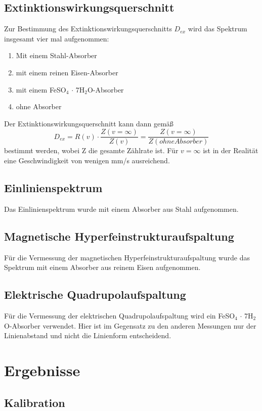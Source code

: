 \documentclass[12pt,a4paper]{article}
\begin{document}
\subsection{Extinktionswirkungsquerschnitt}
Zur Bestimmung des Extinktionswirkungsquerschnitts $D_{ex}$ wird das Spektrum insgesamt vier mal aufgenommen:
\begin{enumerate}
\item Mit einem Stahl-Absorber
\item mit einem reinen Eisen-Absorber
\item mit einem FeSO$_4$ $\cdot$ 7H$_2$O-Absorber
\item ohne Absorber 
\end{enumerate} 
Der Extinktionswirkungsquerschnitt kann dann gemäß
\begin{equation}
D_{ex} = R(v) \cdot \dfrac{Z(v = \infty)}{Z(v)} = \dfrac{Z(v = \infty)}{Z(ohne Absorber)}
\end{equation}
bestimmt werden, wobei Z die gesamte Zählrate ist. Für $v = \infty$ ist in der Realität eine Geschwindigkeit von wenigen mm/s ausreichend.

\subsection{Einlinienspektrum}
Das Einlinienspektrum wurde mit einem Absorber aus Stahl aufgenommen.

\subsection{Magnetische Hyperfeinstrukturaufspaltung}
Für die Vermessung der magnetischen Hyperfeinstrukturaufspaltung wurde das Spektrum mit einem Absorber aus reinem Eisen aufgenommen.

\subsection{Elektrische Quadrupolaufspaltung}
Für die Vermessung der elektrischen Quadrupolaufspaltung wird ein FeSO$_4$ $\cdot$ 7H$_2$O-Absorber verwendet. Hier ist im Gegensatz zu den anderen Messungen nur der Linienabstand und nicht die Linienform entscheidend.

\section{Ergebnisse}
\subsection{Kalibration}
\end{document}
